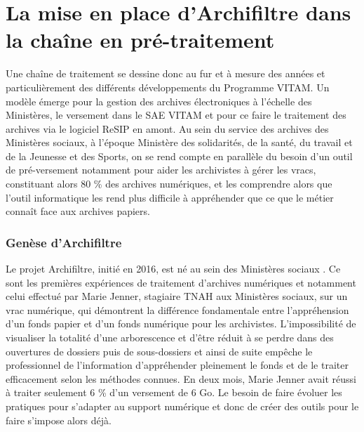 \chapter{La mise en place d’Archifiltre dans la chaîne en pré-traitement \protect\footnotemark}


Une chaîne de traitement se dessine donc au fur et à mesure des années et particulièrement des différents développements du Programme \gls{VITAM}. Un modèle émerge pour la gestion des archives électroniques à l’échelle des Ministères, le versement dans le \gls{SAE} \gls{VITAM} et pour ce faire le traitement des archives via le logiciel ReSIP en amont. Au sein du service des archives des Ministères sociaux, à l’époque Ministère des solidarités, de la santé, du travail et de la Jeunesse et des Sports, on se rend compte en parallèle du besoin d’un outil de pré-versement notamment pour aider les archivistes à gérer les vracs, constituant alors 80 \% des archives numériques, et les comprendre alors que l’outil informatique les rend plus difficile à appréhender que ce que le métier connaît face aux archives papiers.

\subsection{Genèse d’Archifiltre}
Le projet \gls{Archifiltre},  initié en 2016, est né au sein des Ministères sociaux . Ce sont les premières expériences de traitement d'archives numériques et notamment celui effectué par Marie Jenner, stagiaire TNAH aux Ministères sociaux, sur un vrac numérique, qui démontrent la différence fondamentale entre l’appréhension d’un fonds papier et d’un fonds numérique pour les archivistes. L’impossibilité de visualiser la totalité d’une arborescence et d’être réduit à se perdre dans des ouvertures de dossiers puis de sous-dossiers et ainsi de suite empêche le professionnel de l’information d’appréhender pleinement le fonds et de le traiter efficacement selon les méthodes connues. En deux mois, Marie Jenner avait réussi à traiter seulement 6 \% d'un versement de 6 Go. Le besoin de faire évoluer les pratiques pour s’adapter au support numérique et donc de créer des outils pour le faire s’impose alors déjà.


